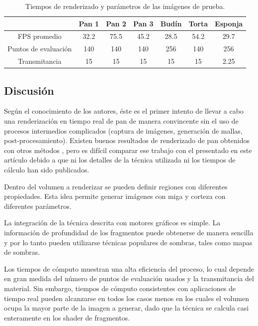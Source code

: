 \documentclass[oneside,a4paper,spanish,links]{amca}
\begin{document}
\begin{table}[htb]
\centering
\begin{tabular}{|c|c|c|c|c|c|c|}
\hline &  Pan 1 & Pan 2 & Pan 3 & Budín & Torta & Esponja \\
\hline
\hline
 FPS promedio  & 32.2 &  75.5 &  45.2 & 28.5 &  54.2 & 29.7\\
\hline
 Puntos de evaluación &  140 &  140 &  140 & 256 &  140 & 256 \\
\hline
 Transmitancia &  15 &  15 &  15 & 15 &  15 & 2.25 \\
\hline
\end{tabular}
\caption{Tiempos de renderizado y parámetros de las imágenes de prueba.}
\label{tab:n1}
\end{table}

\subsection{Discusi\'on}

Según el conocimiento de los autores, éste es el primer intento de llevar a cabo una renderización en tiempo real de pan de manera convincente sin el uso de procesos
intermedios complicados (captura de imágenes, generación de mallas,
post-procesamiento). Existen buenos resultados de renderizado de pan
obtenidos con otros métodos \citep{Cho2007}, pero es difícil
comparar ese trabajo con el presentado en este artículo debido a que
ni los detalles de la técnica utilizada ni los tiempos de cálculo han
sido publicados.

Dentro del volumen a renderizar se pueden definir regiones
con diferentes propiedades. Esta idea permite generar
imágenes con miga y corteza con diferentes parámetros.

La integración de la técnica descrita con motores gráficos es
simple. La información de profundidad de los fragmentos puede obtenerse de manera sencilla y por lo tanto pueden utilizarse técnicas
populares de sombras, tales como mapas de sombras.

Los tiempos de cómputo muestran una alta eficiencia del proceso, lo
cual depende en gran medida del número de puntos de evaluación usados
y la transmitancia del material. Sin embargo, tiempos de cómputo
consistentes con aplicaciones de tiempo real pueden alcanzarse en
todos los casos menos en los cuales el volumen ocupa la mayor parte de
la imagen a generar, dado que la técnica se calcula casi enteramente
en los shader de fragmentos. 
\end{document}
